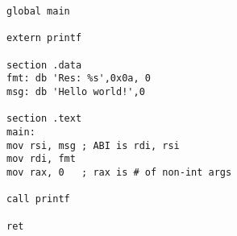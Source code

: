 
\lstset{ 
	extendedchars=true,              %
	keepspaces=true,                 %
	language=[x86masm]Assembler,                 %
	showstringspaces=false
}

\begin{lstlisting}[frame=single]  % Start your code-block
global main

extern printf

section .data
fmt: db 'Res: %s',0x0a, 0
msg: db 'Hello world!',0

section .text
main:
mov rsi, msg ; ABI is rdi, rsi
mov rdi, fmt
mov rax, 0   ; rax is # of non-int args

call printf

ret
\end{lstlisting}